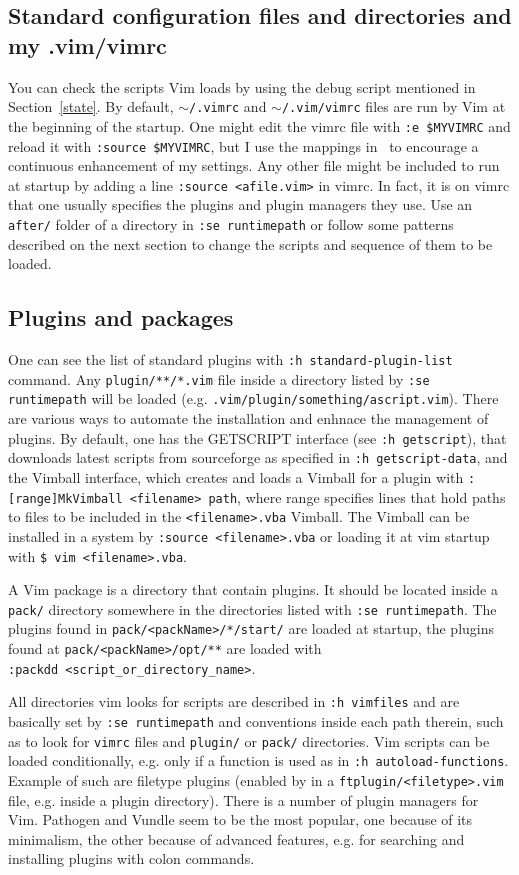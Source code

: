 \documentclass{article}
\newcommand{\tttt}[1]{\texttt{#1}}
\begin{document}
\subsection{Standard configuration files and directories and my .vim/vimrc}
You can check the scripts Vim loads by using the debug script mentioned
in Section~\ref{state}.
By default, \tttt{$\sim$/.vimrc} and \tttt{$\sim$/.vim/vimrc} files are run by Vim at the beginning of the startup.
One might edit the vimrc file with \tttt{:e \$MYVIMRC}
and reload it with \tttt{:source \$MYVIMRC}, but
I use the mappings in~\cite{vimrc} to encourage a continuous enhancement of my settings.
Any other file might be included to run at startup by
adding a line \tttt{:source <afile.vim>} in vimrc.
In fact, it is on vimrc that one usually specifies the plugins
and plugin managers they use.
Use an \tttt{after/} folder of a directory in \tttt{:se runtimepath}
or follow some patterns described on the next section to change the
scripts and sequence of them to be loaded.

\subsection{Plugins and packages}
One can see the list of standard plugins
with \tttt{:h standard-plugin-list} command.
Any \tttt{plugin/**/*.vim} file inside a directory
listed by \tttt{:se runtimepath} will be loaded
(e.g. \tttt{.vim/plugin/something/ascript.vim}).
There are various ways to automate the installation
and enhnace the management of plugins.
By default, one has the GETSCRIPT interface (see \tttt{:h getscript}),
that downloads latest scripts from sourceforge as specified in \tttt{:h getscript-data},
and the Vimball interface, which creates and loads a Vimball for a plugin
with \tttt{:[range]MkVimball <filename> path}, where range specifies lines
that hold paths to files to be included in the \tttt{<filename>.vba} Vimball.
The Vimball can be installed in a system by \tttt{:source <filename>.vba}
or loading it at vim startup with \tttt{\$ vim <filename>.vba}.

A Vim package is a directory that contain plugins.
It should be located inside a \tttt{pack/} directory
somewhere in the directories listed with \tttt{:se runtimepath}.
The plugins found in \tttt{pack/<packName>/*/start/} are loaded
at startup, the plugins found at
\tttt{pack/<packName>/opt/**} are loaded with\\
\tttt{:packdd <script\_or\_directory\_name>}.

All directories vim looks for scripts are described
in \tttt{:h vimfiles} and are basically set by
\tttt{:se runtimepath} and conventions inside
each path therein, such as to look for \tttt{vimrc} files
and \tttt{plugin/} or \tttt{pack/} directories.
Vim scripts can be loaded conditionally,
e.g. only if a function is used as in \tttt{:h autoload-functions}.
Example of such are filetype plugins (enabled by in a \tttt{ftplugin/<filetype>.vim} file,
e.g. inside a plugin directory).
There is a number of plugin managers for Vim.
Pathogen and Vundle seem to be the most popular,
one because of its minimalism, the other because of
advanced features, e.g. for searching and installing plugins with
colon commands.
\end{document}
